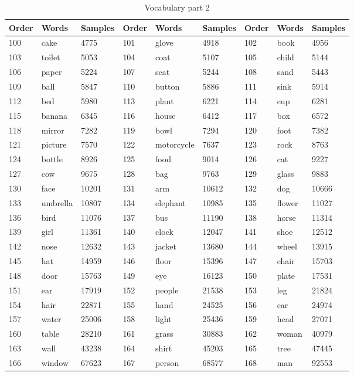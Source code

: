 \documentclass[12pt,a4paper]{report}
\begin{document}
\begin{table}[]
\centering
\caption{Vocabulary part 2}
\label{Vocabulary part 2}
\begin{tabular}{lllllllll}
    Order&Words & Samples&Order&Words & Samples&Order&Words & Samples\\
    \hline
    
100 & cake     & 4775  & 101 & glove      & 4918  & 102 & book   & 4956  \\
103 & toilet   & 5053  & 104 & coat       & 5107  & 105 & child  & 5144  \\
106 & paper    & 5224  & 107 & seat       & 5244  & 108 & sand   & 5443  \\
109 & ball     & 5847  & 110 & button     & 5886  & 111 & sink   & 5914  \\
112 & bed      & 5980  & 113 & plant      & 6221  & 114 & cup    & 6281  \\
115 & banana   & 6345  & 116 & house      & 6412  & 117 & box    & 6572  \\
118 & mirror   & 7282  & 119 & bowl       & 7294  & 120 & foot   & 7382  \\
121 & picture  & 7570  & 122 & motorcycle & 7637  & 123 & rock   & 8763  \\
124 & bottle   & 8926  & 125 & food       & 9014  & 126 & cat    & 9227  \\
127 & cow      & 9675  & 128 & bag        & 9763  & 129 & glass  & 9883  \\
130 & face     & 10201 & 131 & arm        & 10612 & 132 & dog    & 10666 \\
133 & umbrella & 10807 & 134 & elephant   & 10985 & 135 & flower & 11027 \\
136 & bird     & 11076 & 137 & bus        & 11190 & 138 & horse  & 11314 \\
139 & girl     & 11361 & 140 & clock      & 12047 & 141 & shoe   & 12512 \\
142 & nose     & 12632 & 143 & jacket     & 13680 & 144 & wheel  & 13915 \\
145 & hat      & 14959 & 146 & floor      & 15396 & 147 & chair  & 15703 \\
148 & door     & 15763 & 149 & eye        & 16123 & 150 & plate  & 17531 \\
151 & ear      & 17919 & 152 & people     & 21538 & 153 & leg    & 21824 \\
154 & hair     & 22871 & 155 & hand       & 24525 & 156 & car    & 24974 \\
157 & water    & 25006 & 158 & light      & 25436 & 159 & head   & 27071 \\
160 & table    & 28210 & 161 & grass      & 30883 & 162 & woman  & 40979 \\
163 & wall     & 43238 & 164 & shirt      & 45203 & 165 & tree   & 47445 \\
166 & window   & 67623 & 167 & person     & 68577 & 168 & man    & 92553
\end{tabular}
\end{table}
\end{document}
